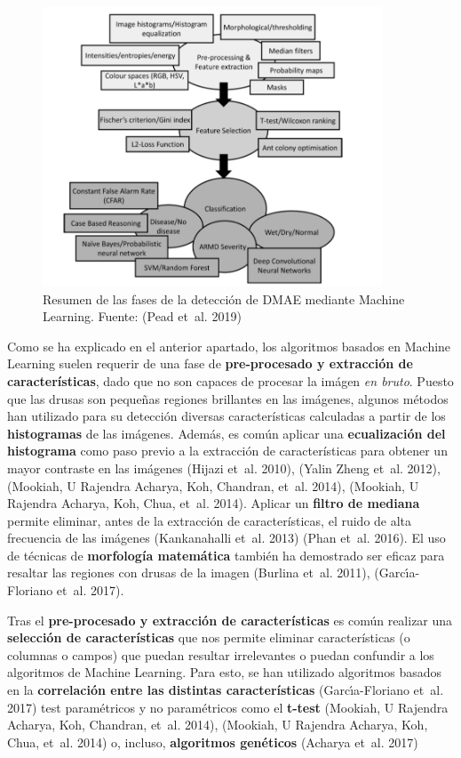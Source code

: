 \documentclass[
  12pt,
  spanish,
  a4paperpaper,
]{report}
\begin{document}
\begin{figure}
\centering
\includegraphics[width=0.9\textwidth,height=\textheight]{source/figures/fases-amd.png}
\caption{Resumen de las fases de la detección de DMAE mediante Machine
Learning. Fuente: (Pead et~al. 2019) \label{metodosamd}}
\end{figure}

Como se ha explicado en el anterior apartado, los algoritmos basados en
Machine Learning suelen requerir de una fase de \textbf{pre-procesado y
extracción de características}, dado que no son capaces de procesar la
imágen \emph{en bruto}. Puesto que las drusas son pequeñas regiones
brillantes en las imágenes, algunos métodos han utilizado para su
detección diversas características calculadas a partir de los
\textbf{histogramas} de las imágenes. Además, es común aplicar una
\textbf{ecualización del histograma} como paso previo a la extracción de
características para obtener un mayor contraste en las imágenes (Hijazi
et~al. 2010), (Yalin Zheng et~al. 2012), (Mookiah, U Rajendra Acharya,
Koh, Chandran, et~al. 2014), (Mookiah, U Rajendra Acharya, Koh, Chua,
et~al. 2014). Aplicar un \textbf{filtro de mediana} permite eliminar,
antes de la extracción de características, el ruido de alta frecuencia
de las imágenes (Kankanahalli et~al. 2013) (Phan et~al. 2016). El uso de
técnicas de \textbf{morfología matemática} también ha demostrado ser
eficaz para resaltar las regiones con drusas de la imagen (Burlina
et~al. 2011), (Garcı́a-Floriano et~al. 2017).

Tras el \textbf{pre-procesado y extracción de características} es común
realizar una \textbf{selección de características} que nos permite
eliminar características (o columnas o campos) que puedan resultar
irrelevantes o puedan confundir a los algoritmos de Machine Learning.
Para esto, se han utilizado algoritmos basados en la \textbf{correlación
entre las distintas características} (Garcı́a-Floriano et~al. 2017) test
paramétricos y no paramétricos como el \textbf{t-test} (Mookiah, U
Rajendra Acharya, Koh, Chandran, et~al. 2014), (Mookiah, U Rajendra
Acharya, Koh, Chua, et~al. 2014) o, incluso, \textbf{algoritmos
genéticos} (Acharya et~al. 2017)
\end{document}

